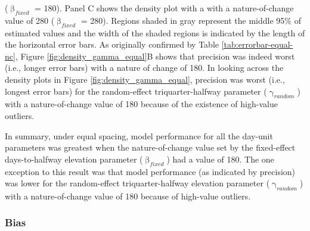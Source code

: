 \documentclass[
12pt, %
twoside,
english]{guelphthesis}
\begin{document}
 (\(\upbeta_{fixed}\) = 180). Panel C shows the density plot with a with a nature-of-change value of 280 (\(\upbeta_{fixed}\) = 280). Regions shaded in gray represent the middle 95\% of estimated values and the width of the shaded regions is indicated by the length of the horizontal error bars. As originally confirmed by Table \ref{tab:errorbar-equal-nc}, Figure \ref{fig:density_gamma_equal}B shows that precision was indeed worst (i.e., longer error bars) with a nature of change of 180. In looking across the density plots in Figure \ref{fig:density_gamma_equal}, precision was worst (i.e., longest error bars) for the random-effect triquarter-halfway parameter (\(\upgamma_{random}\)) with a nature-of-change value of 180 because of the existence of high-value outliers.

In summary, under equal spacing, model performance for all the day-unit parameters was greatest when the nature-of-change value set by the fixed-effect days-to-halfway elevation parameter (\(\upbeta_{fixed}\)) had a value of 180. The one exception to this result was that model performance (as indicated by precision) was lower for the random-effect triquarter-halfway elevation parameter (\(\upgamma_{random}\)) with a nature-of-change value of 180 because of high-value outliers.

\hypertarget{bias-equal-exp1}{%
\subsubsection{Bias}\label{bias-equal-exp1}}
\end{document}
